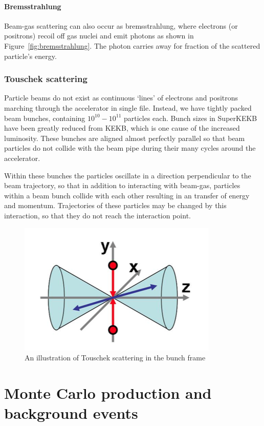 \documentclass[12pt]{thesis}  %
\begin{document}
\subsubsection{Bremsstrahlung}

Beam-gas scattering can also occur as bremsstrahlung, where electrons (or positrons) recoil off gas nuclei and emit photons as shown in Figure~\ref{fig:bremsstrahlung}. The photon carries away for fraction of the scattered particle's energy.


\subsection{Touschek scattering}

Particle beams do not exist as continuous `lines' of electrons and positrons marching through the accelerator in single file. Instead, we have tightly packed beam bunches, containing $10^{10} - 10^{11}$ particles each. Bunch sizes in SuperKEKB have been greatly reduced from KEKB, which is one cause of the increased luminosity. These bunches are aligned almost perfectly parallel so that beam particles do not collide with the beam pipe during their many cycles around the accelerator.

Within these bunches the particles oscillate in a direction perpendicular to the beam trajectory, so that in addition to interacting with beam-gas, particles within a beam bunch collide with each other resulting in an transfer of energy and momentum. Trajectories of these particles may be changed by this interaction, so that they do not reach the interaction point. 

\begin{figure}
\centering
\includegraphics[width=0.5\linewidth]{images/touschek-beam-frame.png}
\caption[]%
{{\small An illustration of Touschek scattering in the bunch frame}}
\label{fig:touschek}
\end{figure}


\chapter{Monte Carlo production and background events}
\end{document}
